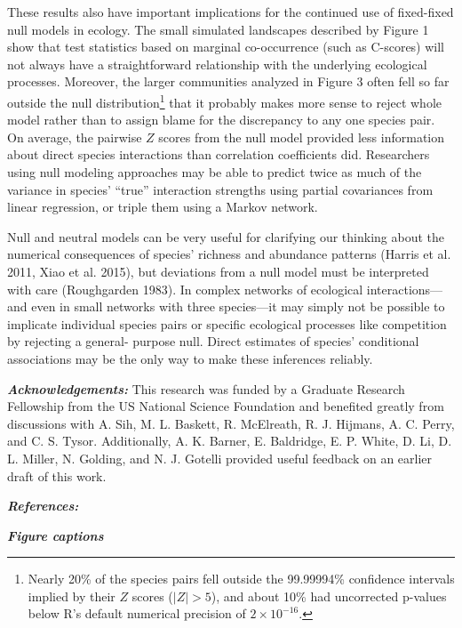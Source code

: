\documentclass[12pt,]{article}
\begin{document}
\begin{spacing}{1.9}
\begin{flushleft}
These results also have important implications for the continued use of
fixed-fixed null models in ecology. The small simulated landscapes
described by Figure 1 show that test statistics based on marginal
co-occurrence (such as C-scores) will not always have a straightforward
relationship with the underlying ecological processes. Moreover, the
larger communities analyzed in Figure 3 often fell so far outside the
null distribution\footnote{Nearly 20\% of the species pairs fell outside
  the 99.99994\% confidence intervals implied by their \(Z\) scores
  (\(|Z| > 5\)), and about 10\% had uncorrected p-values below R's
  default numerical precision of \(2 \times 10^{-16}\).} that it
probably makes more sense to reject whole model rather than to assign
blame for the discrepancy to any one species pair. On average, the
pairwise \(Z\) scores from the null model provided less information
about direct species interactions than correlation coefficients did.
Researchers using null modeling approaches may be able to predict twice
as much of the variance in species' ``true'' interaction strengths using
partial covariances from linear regression, or triple them using a
Markov network.

Null and neutral models can be very useful for clarifying our thinking
about the numerical consequences of species' richness and abundance
patterns (Harris et al. 2011, Xiao et al. 2015), but deviations from a
null model must be interpreted with care (Roughgarden 1983). In complex
networks of ecological interactions---and even in small networks with
three species---it may simply not be possible to implicate individual
species pairs or specific ecological processes like competition by
rejecting a general- purpose null. Direct estimates of species'
conditional associations may be the only way to make these inferences
reliably.

\textbf{\emph{Acknowledgements:}} This research was funded by a Graduate
Research Fellowship from the US National Science Foundation and
benefited greatly from discussions with A. Sih, M. L. Baskett, R.
McElreath, R. J. Hijmans, A. C. Perry, and C. S. Tysor. Additionally, A.
K. Barner, E. Baldridge, E. P. White, D. Li, D. L. Miller, N. Golding,
and N. J. Gotelli provided useful feedback on an earlier draft of this
work.

\textbf{\emph{References:}}

\textbf{\emph{Figure captions}}


\end{flushleft}
\end{spacing}
\end{document}
